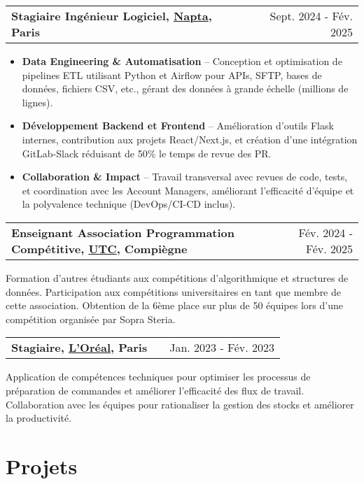 \documentclass[a4paper,10pt]{article}
\makeatletter
\newenvironment{jobshort}[2]
    {
    \begin{tabularx}{\linewidth}{@{}l X r@{}}
    \textbf{#1} & \hfill &  #2 \\[2pt]
    \end{tabularx}
    } {}
\newenvironment{joblong}[2]
    {
    \begin{tabularx}{\linewidth}{@{}l X r@{}}
    \textbf{#1} & \hfill &  #2 \\[2pt]
    \end{tabularx}
    \begin{minipage}[t]{\linewidth}
    \begin{itemize}[nosep,after=\strut, leftmargin=1em, itemsep=3pt,label=--]
    }
    {
    \end{itemize}
    \end{minipage}    
    }
\makeatother
\begin{document}
\begin{joblong}{Stagiaire Ingénieur Logiciel, \href{https://www.napta.io}{Napta}, Paris}{Sept. 2024 - Fév. 2025}
    \item \textbf{Data Engineering \& Automatisation} – Conception et optimisation de pipelines ETL utilisant Python et Airflow pour APIs, SFTP, bases de données, fichiers CSV, etc., gérant des données à grande échelle (millions de lignes).
    \item \textbf{Développement Backend et Frontend} – Amélioration d'outils Flask internes, contribution aux projets React/Next.js, et création d'une intégration GitLab-Slack réduisant de 50\% le temps de revue des PR.
    \item \textbf{Collaboration \& Impact} – Travail transversal avec revues de code, tests, et coordination avec les Account Managers, améliorant l'efficacité d'équipe et la polyvalence technique (DevOps/CI-CD inclus).
\end{joblong}

\begin{jobshort}{Enseignant Association Programmation Compétitive, \href{https://www.utc.fr}{UTC}, Compiègne}{Fév. 2024 - Fév. 2025}
    Formation d'autres étudiants aux compétitions d'algorithmique et structures de données. Participation aux compétitions universitaires en tant que membre de cette association. Obtention de la 6ème place sur plus de 50 équipes lors d'une compétition organisée par Sopra Steria.
\end{jobshort}

\begin{jobshort}{Stagiaire, \href{https://www.loreal.com}{L'Oréal}, Paris}{Jan. 2023 - Fév. 2023}
    Application de compétences techniques pour optimiser les processus de préparation de commandes et améliorer l'efficacité des flux de travail. Collaboration avec les équipes pour rationaliser la gestion des stocks et améliorer la productivité.
\end{jobshort}

\section{Projets}
\end{document}
